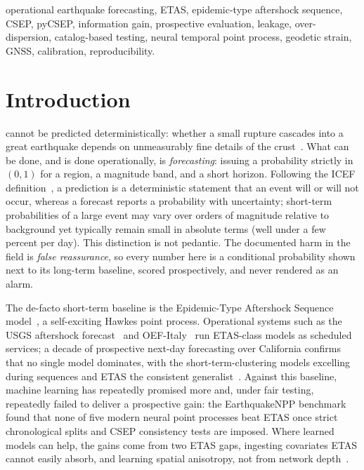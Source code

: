\documentclass[journal]{IEEEtran}
\begin{document}
{\begin{IEEEkeywords}
operational earthquake forecasting, ETAS, epidemic-type aftershock sequence, CSEP,
pyCSEP, information gain, prospective evaluation, leakage, over-dispersion, catalog-based
testing, neural temporal point process, geodetic strain, GNSS, calibration, reproducibility.
\end{IEEEkeywords}}

\maketitle
\IEEEdisplaynotcompsoctitleabstractindextext
\IEEEpeerreviewmaketitle

\section{Introduction}

 cannot be predicted deterministically: whether a small
rupture cascades into a great earthquake depends on unmeasurably fine details of the
crust~\cite{geller1997}. What can be done, and is done operationally, is
\emph{forecasting}: issuing a probability strictly in $(0,1)$ for a region, a magnitude
band, and a short horizon. Following the ICEF definition~\cite{jordan2011}, a prediction
is a deterministic statement that an event will or will not occur, whereas a forecast
reports a probability with uncertainty; short-term probabilities of a large event may
vary over orders of magnitude relative to background yet typically remain small in
absolute terms (well under a few percent per day). This distinction is not pedantic. The
documented harm in the field is \emph{false reassurance}, so every number here is a
conditional probability shown next to its long-term baseline, scored prospectively, and
never rendered as an alarm.

The de-facto short-term baseline is the Epidemic-Type Aftershock Sequence
model~\cite{ogata1988,ogata1998}, a self-exciting Hawkes point process. Operational
systems such as the USGS aftershock forecast~\cite{reasenberg1989,page2016} and
OEF-Italy~\cite{spassiani2023} run ETAS-class models as scheduled services; a decade of
prospective next-day forecasting over California confirms that no single model dominates,
with the short-term-clustering models excelling during sequences and ETAS the consistent
generalist~\cite{serafini2025}. Against this baseline, machine learning has repeatedly
promised more and, under fair testing, repeatedly failed to deliver a prospective gain:
the EarthquakeNPP benchmark~\cite{stockman2026} found that none of five modern neural
point processes beat ETAS once strict chronological splits and CSEP consistency tests are
imposed. Where learned models can help, the gains come from two ETAS gaps, ingesting
covariates ETAS cannot easily absorb, and learning spatial anisotropy, not from network
depth~\cite{dascher2023,zlydenko2023}.
\end{document}
